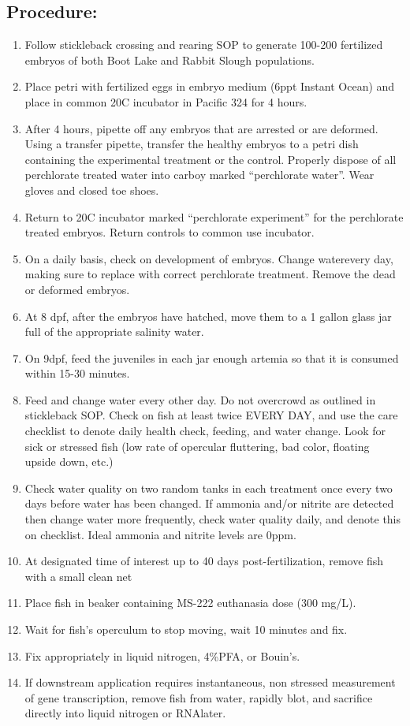 \documentclass[
]{book}
\providecommand{\tightlist}{%
  \setlength{\itemsep}{0pt}\setlength{\parskip}{0pt}}
\begin{document}
\hypertarget{procedure-14}{%
\subsection{Procedure:}\label{procedure-14}}

\begin{enumerate}
\def\labelenumi{\arabic{enumi}.}
\tightlist
\item
  Follow stickleback crossing and rearing SOP to generate 100-200 fertilized embryos of both Boot Lake and Rabbit Slough populations.
\item
  Place petri with fertilized eggs in embryo medium (6ppt Instant Ocean) and place in common 20C incubator in Pacific 324 for 4 hours.
\item
  After 4 hours, pipette off any embryos that are arrested or are deformed. Using a transfer pipette, transfer the healthy embryos to a petri dish containing the experimental treatment or the control. Properly dispose of all perchlorate treated water into carboy marked ``perchlorate water''. Wear gloves and closed toe shoes.
\item
  Return to 20C incubator marked ``perchlorate experiment'' for the perchlorate treated embryos. Return controls to common use incubator.
\item
  On a daily basis, check on development of embryos. Change waterevery day, making sure to replace with correct perchlorate treatment. Remove the dead or deformed embryos.
\item
  At 8 dpf, after the embryos have hatched, move them to a 1 gallon glass jar full of the appropriate salinity water.
\item
  On 9dpf, feed the juveniles in each jar enough artemia so that it is consumed within 15-30 minutes.
\item
  Feed and change water every other day. Do not overcrowd as outlined in stickleback SOP. Check on fish at least twice EVERY DAY, and use the care checklist to denote daily health check, feeding, and water change. Look for sick or stressed fish (low rate of opercular fluttering, bad color, floating upside down, etc.)
\item
  Check water quality on two random tanks in each treatment once every two days before water has been changed. If ammonia and/or nitrite are detected then change water more frequently, check water quality daily, and denote this on checklist. Ideal ammonia and nitrite levels are 0ppm.
\item
  At designated time of interest up to 40 days post-fertilization, remove fish with a small clean net
\item
  Place fish in beaker containing MS-222 euthanasia dose (300 mg/L).
\item
  Wait for fish's operculum to stop moving, wait 10 minutes and fix.
\item
  Fix appropriately in liquid nitrogen, 4\%PFA, or Bouin's.
\item
  If downstream application requires instantaneous, non stressed measurement of gene transcription, remove fish from water, rapidly blot, and sacrifice directly into liquid nitrogen or RNAlater.
\end{enumerate}
\end{document}
